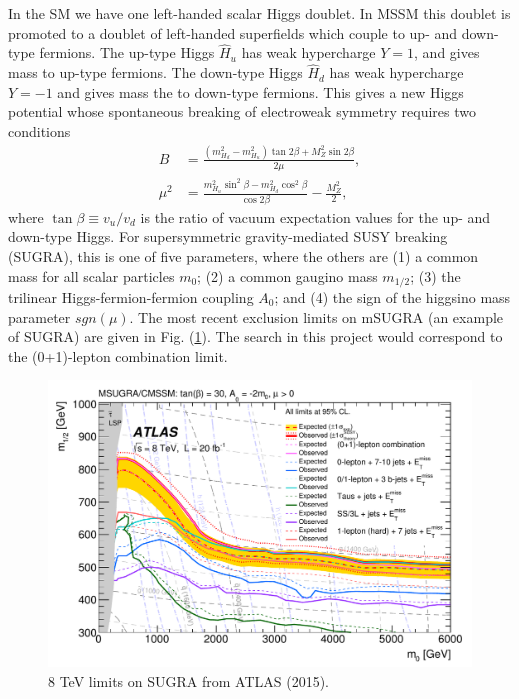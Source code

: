 \documentclass[11pt]{article}
\begin{document}
\begin{flushleft}
In the SM we have one left-handed scalar Higgs doublet. In MSSM this doublet is promoted to a doublet of left-handed superfields which couple to up- and down-type fermions. The up-type Higgs $\hat{H}_u$ has weak hypercharge $Y=1$, and gives mass to up-type fermions. The down-type Higgs $\hat{H}_d$ has weak hypercharge $Y=-1$ and gives mass the to down-type fermions. This gives a new Higgs potential whose spontaneous breaking of electroweak symmetry requires two conditions
\begin{align*}
B &= \frac{(m_{H_d}^2-m^2_{H_u}) \tan 2 \beta + M_Z^2 \sin 2 \beta}{2 \mu},\\
\mu^2 &= \frac{m_{H_u}^2 \sin^2 \beta - m_{H_d}^2 \cos^2 \beta}{\cos 2 \beta} - \frac{M_Z^2}{2},
\end{align*}
where $\tan \beta \equiv v_u/v_d$ is the ratio of vacuum expectation values for the up- and down-type Higgs. For supersymmetric gravity-mediated SUSY breaking (SUGRA), this is one of five parameters, where the others are (1) a common mass for all scalar particles $m_0$; (2) a common gaugino mass $m_{1/2}$; (3) the trilinear Higgs-fermion-fermion coupling $A_0$; and (4) the sign of the higgsino mass parameter $sgn(\mu)$. The most recent exclusion limits on mSUGRA (an example of SUGRA) are given in Fig. (\ref{fig:: atlas msugra}). The search in this project would correspond to the (0+1)-lepton combination limit.
\end{flushleft}
\begin{figure}[H]
\centering
\includegraphics[scale=0.6]{plots/ATLAS_SUSY_MSUGRA.pdf}
\caption{$8$ TeV limits on SUGRA from ATLAS (2015).}
\label{fig:: atlas msugra}
\end{figure}
\end{document}
